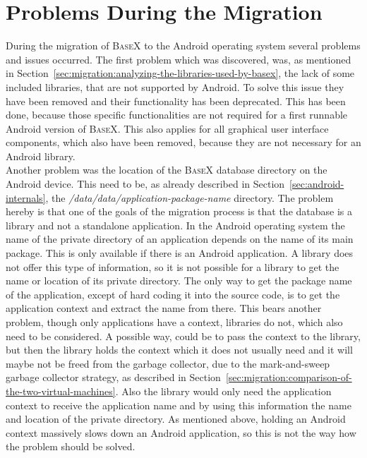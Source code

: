 \section{Problems During the Migration}
\label{sec:migration:problems-during-the-migration}
During the migration of \textsc{BaseX} to the Android operating system several problems and issues occurred.
The first problem which was discovered, was, as mentioned in Section~\ref{sec:migration:analyzing-the-libraries-used-by-basex}, the lack of some included libraries, that are not supported by Android.
To solve this issue they have been removed and their functionality has been deprecated.
This has been done, because those specific functionalities are not required for a first runnable Android version of \textsc{BaseX}. 
This also applies for all graphical user interface components, which also have been removed, because they are not necessary for an Android library.\\
Another problem was the location of the \textsc{BaseX} database directory on the Android device.
This need to be, as already described in Section~\ref{sec:android-internals}, the \textit{/data/data/app\-lication-package-name} directory.
The problem hereby is that one of the goals of the migration process is that the database is a library and not a standalone application.
In the Android operating system the name of the private directory of an application depends on the name of its main package.
This is only available if there is an Android application. 
A library does not offer this type of information, so it is not possible for a library to get the name or location of its private directory.
The only way to get the package name of the application, except of hard coding it into the source code, is to get the application context and extract the name from there.
This bears another problem, though only applications have a context, libraries do not, which also need to be considered. 
A possible way, could be to pass the context to the library, but then the library holds the context which it does not usually need and it will maybe not be freed from the garbage collector, due to the mark-and-sweep garbage collector strategy, as described in Section~\ref{sec:migration:comparison-of-the-two-virtual-machines}.
Also the library would only need the application context to receive the application name and by using this information the name and location of the private directory.
As mentioned above, holding an Android context massively slows down an Android application, so this is not the way how the problem should be solved.

